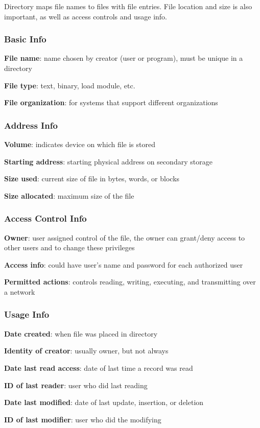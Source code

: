 \documentclass[11pt]{article}
\begin{document}
Directory maps file names to files with file entries.
File location and size is also important, as well as access controls and usage info.
\subsubsection{Basic Info}
\label{sec:org7b189e9}
\textbf{File name}: name chosen by creator (user or program), must be unique in a directory

\textbf{File type}: text, binary, load module, etc.

\textbf{File organization}: for systems that support different organizations
\subsubsection{Address Info}
\label{sec:orgbd2139e}
\textbf{Volume}: indicates device on which file is stored

\textbf{Starting address}: starting physical address on secondary storage

\textbf{Size used}: current size of file in bytes, words, or blocks

\textbf{Size allocated}: maximum size of the file
\subsubsection{Access Control Info}
\label{sec:orge1cfefc}
\textbf{Owner}: user assigned control of the file, the owner can grant/deny access to other users and to
change these privileges

\textbf{Access info}: could have user's name and password for each authorized user

\textbf{Permitted actions}: controls reading, writing, executing, and transmitting over a network
\subsubsection{Usage Info}
\label{sec:orga4d166d}
\textbf{Date created}: when file was placed in directory

\textbf{Identity of creator}: usually owner, but not always

\textbf{Date last read access}: date of last time a record was read

\textbf{ID of last reader}: user who did last reading

\textbf{Date last modified}: date of last update, insertion, or deletion

\textbf{ID of last modifier}: user who did the modifying
\end{document}
